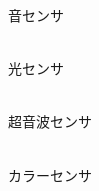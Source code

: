 \documentclass[11pt]{jarticle}
\begin{document}
\begin{center}
\begin{minipage}[t]{4cm}
    音センサ
  \end{minipage}
  \begin{minipage}[t]{4cm}\centering
    \\
    光センサ
  \end{minipage}
  \begin{minipage}[t]{4cm}\centering
    \\
    超音波センサ
  \end{minipage}
  \begin{minipage}[t]{4cm}\centering
    \\
    カラーセンサ
  \end{minipage}
\end{center}
\end{document}
